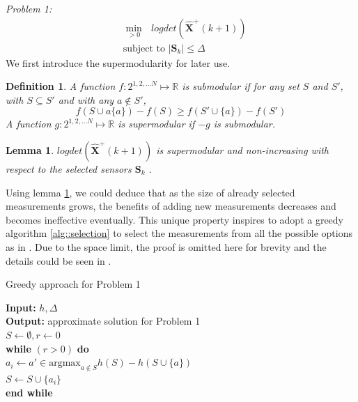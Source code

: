 \documentclass[conference]{IEEEtran}
\newtheorem{lemma}{Lemma}
\newtheorem{definition}{Definition}
\begin{document}
\emph{Problem 1:}
\begin{equation}
\begin{split}
&\min_{>0}   \text{   } logdet(\hat{\boldsymbol{X}}^+(k+1))
\\
&\text{subject to } |\boldsymbol{S}_k| \leq \Delta
\end{split}
\label{equ::opt_1}
\end{equation}
We first introduce the supermodularity for later use.
\begin{definition}
	A function $f:2^{1,2,...N} \mapsto \mathbb{R}$ is submodular if for any set $S$ and $S'$, with $S\subseteq S'$ and with any $a\notin S'$,
	\begin{equation*}
		f(S \cup a\{a\}) - f(S) \geq f(S' \cup \{a\}) - f(S')
	\end{equation*}
	A function $g:2^{1,2,...N} \mapsto \mathbb{R}$ is supermodular if $-g$ is submodular.
\end{definition}
\begin{lemma}
	$logdet(\hat{\boldsymbol{X}}^+(k+1))$ is supermodular and non-increasing with respect to the selected sensors $\boldsymbol{S}_k$ \cite{tzoumas2016sensor}.
	\label{lemma::1}
\end{lemma}
Using lemma \ref{lemma::1}, we could deduce that as the size of already selected measurements grows, the benefits of adding new measurements decreases and becomes ineffective eventually.
This unique property inspires to adopt a greedy algorithm \ref{alg::selection} to select the measurements from all the possible options as in \cite{tzoumas2016sensor}.
Due to the space limit, the proof is omitted here for brevity and the details could be seen in \cite{tzoumas2016sensor,tzoumas2018selecting}.

\begin{algorithm}
	\caption{Greedy approach for Problem 1}
	\textbf{Input:} $h,\Delta$ \\
	\textbf{Output: } approximate solution for Problem 1 \\
	$S \leftarrow \emptyset, r \leftarrow 0$\\
	\textbf{while} $(r>0)$ \textbf{do} \\
		$a_i \leftarrow a'\in \text{argmax}_{a\notin S} h(S) - h(S\cup \{a\})$ \\
		$S \leftarrow S \cup \{a_i\}$\\
	\textbf{end while}
	\label{alg::selection}
\end{algorithm}
\end{document}
